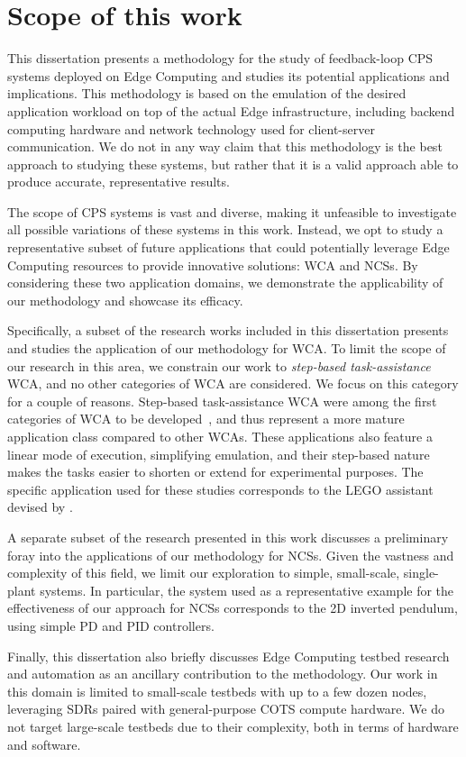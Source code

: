 \section{Scope of this work}

This dissertation presents a methodology for the study of feedback-loop \gls{CPS} systems deployed on Edge Computing and studies its potential applications and implications.
This methodology is based on the emulation of the desired application workload on top of the actual Edge infrastructure, including backend computing hardware and network technology used for client-server communication.
We do not in any way claim that this methodology is the best approach to studying these systems, but rather that it is a valid approach able to produce accurate, representative results.

The scope of \gls{CPS} systems is vast and diverse, making it unfeasible to investigate all possible variations of these systems in this work. 
Instead, we opt to study a representative subset of future applications that could potentially leverage Edge Computing resources to provide innovative solutions: \gls{WCA} and \glspl{NCS}.
By considering these two application domains, we demonstrate the applicability of our methodology and showcase its efficacy.

Specifically, a subset of the research works included in this dissertation presents and studies the application of our methodology for \gls{WCA}.
To limit the scope of our research in this area, we constrain our work to \emph{step-based task-assistance} \gls{WCA}, and no other categories of \gls{WCA} are considered.
We focus on this category for a couple of reasons.
Step-based task-assistance \gls{WCA} were among the first categories of \gls{WCA} to be developed~\cite{chen2015early}, and thus represent a more mature application class compared to other \glspl{WCA}.
These applications also feature a linear mode of execution, simplifying emulation, and their step-based nature makes the tasks easier to shorten or extend for experimental purposes.
The specific application used for these studies corresponds to the LEGO assistant devised by \citeauthor{chen2015early}\cite{chen2015early}.

A separate subset of the research presented in this work discusses a preliminary foray into the applications of our methodology for \glspl{NCS}.
Given the vastness and complexity of this field, we limit our exploration to simple, small-scale, single-plant systems.
In particular, the system used as a representative example for the effectiveness of our approach for \glspl{NCS} corresponds to the \gls{2D} inverted pendulum, using simple \gls{PD} and \gls{PID} controllers.

Finally, this dissertation also briefly discusses Edge Computing testbed research and automation as an ancillary contribution to the methodology.
Our work in this domain is limited to small-scale testbeds with up to a few dozen nodes, leveraging \glspl{SDR} paired with general-purpose \gls{COTS} compute hardware.
We do not target large-scale testbeds due to their complexity, both in terms of hardware and software.